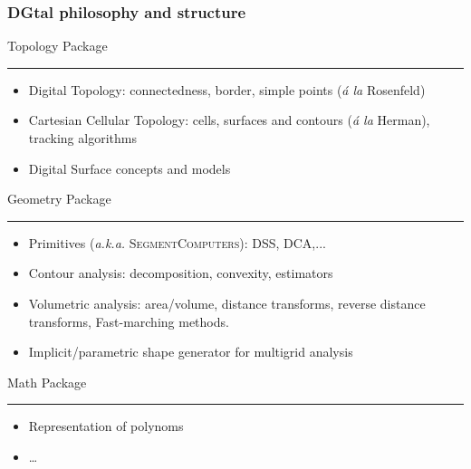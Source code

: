 \documentclass[8pt]{beamer}
\newcommand{\HH}{ \vspace{0.5pt}\hrule}
\begin{document}
\begin{frame}
  \frametitle{DGtal philosophy and structure}
  \begin{alertblock}{\centering Topology Package\HH}
    \small
       \begin{itemize}
    \item Digital Topology: connectedness, border, simple points
      (\emph{\'a la} Rosenfeld)
    \item Cartesian Cellular Topology: cells,  surfaces and contours
      (\emph{\'a la} Herman), tracking algorithms
    \item Digital Surface concepts and models
    \end{itemize}
  \end{alertblock}
    \begin{alertblock}{\centering Geometry Package\HH}
    \small
    \begin{itemize}
    \item Primitives (\emph{a.k.a.} \textsc{SegmentComputers}): DSS, DCA,...
    \item Contour analysis: decomposition, convexity, estimators
    \item Volumetric analysis: area/volume, distance transforms,
      reverse distance transforms, Fast-marching methods.
    \item Implicit/parametric shape generator for multigrid analysis
    \end{itemize}
  \end{alertblock}
\begin{alertblock}{\centering Math Package\HH}
    \footnotesize
    \begin{itemize}
    \item Representation of polynoms
    \item \ldots
    \end{itemize}
  \end{alertblock}
\end{frame}
\end{document}
